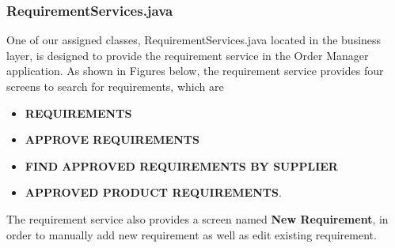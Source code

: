 \documentclass[a4paper,11pt]{article}
\begin{document}
	\subsubsection{RequirementServices.java}
	One of our assigned classes, RequirementServices.java located in the business layer, is designed to provide the requirement service in the Order Manager application. As shown in Figures below, the requirement service provides four screens to search for requirements, which are
	\begin{itemize}
		\item \textbf{REQUIREMENTS}
		\item \textbf{APPROVE REQUIREMENTS}
		\item \textbf{FIND APPROVED REQUIREMENTS BY SUPPLIER}
		\item \textbf{APPROVED PRODUCT REQUIREMENTS}.
		\end{itemize}
		The requirement service also provides a screen named \textbf{New Requirement}, in order to manually add new requirement as well as edit existing requirement.
	
\end{document}
